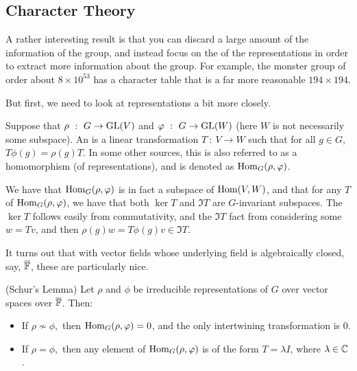 \documentclass{article}
\begin{document}
\subsection{Character Theory}

A rather interesting result is that you can discard a large amount of the information of the group, and instead focus on the  of the representations in order to extract more information about the group. For example, the monster group of order about $8 \times 10^{53}$ has a character table that is a far more reasonable $194 \times 194$.

But first, we need to look at representations a bit more closely.

\begin{definition}
Suppose that $\rho \ : \ G \to \operatorname{GL}(V)$ and $\varphi \ : \ G \to \operatorname{GL}(W)$ (here $W$ is not necessarily some subspace). An  is a linear transformation $T \ : \ V \to W$ such that for all $g \in G$, $T\phi(g) = \rho(g)T$. In some other sources, this is also referred to as a homomorphism (of representations), and is denoted as $\operatorname{Hom}_G(\rho, \varphi)$.
\end{definition}

We have that $\operatorname{Hom}_G(\rho, \varphi)$ is in fact a subspace of $\operatorname{Hom}(V,W)$, and that for any $T$ of $\operatorname{Hom}_G(\rho,\varphi)$, we have that both $\ker T$ and $\Im T$ are $G$-invariant subspaces. The $\ker T$ follows easily from commutativity, and the $\Im T$ fact from considering some $w = Tv$, and then $\rho(g)w = T\phi(g)v \in \Im T$.

It turns out that with vector fields whose underlying field is algebraically closed, say, $\overline{\mathbb F}$, these are particularly nice.
\begin{theorem}
(Schur's Lemma) Let $\rho$ and $\phi$ be irreducible representations of $G$ over vector spaces over $\overline{\mathbb F}$. Then:
\begin{itemize}
    \item If $\rho \not\sim \phi,$ then $\operatorname{Hom}_G(\rho,\varphi) = 0$, and the only intertwining transformation is $0$.
    \item If $\rho = \phi,$ then any element of $\operatorname{Hom}_G(\rho,\varphi)$ is of the form $T=\lambda I$, where $\lambda \in \mathbb C$.
\end{itemize}
\end{theorem}
\end{document}
